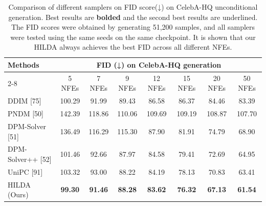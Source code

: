 \begin{table}[t]
    \centering
    \footnotesize
    \setlength{\tabcolsep}{2pt}
    \renewcommand{\arraystretch}{0.9}
    \begin{tabular}{l|ccccccc}
    \toprule
    \multirow{2}{*}{Methods} & \multicolumn{7}{c}{FID (↓) on CelebA-HQ generation} \\
    \cmidrule(lr){2-8}
    & 5 NFEs & 7 NFEs & 9 NFEs & 12 NFEs & 15 NFEs & 20 NFEs & 50 NFEs \\
    \midrule
    DDIM [75] & 100.29 & 91.99 & 89.43 & 86.58 & 86.37 & 84.46 & 83.39 \\
    PNDM [50] & 142.39 & 118.86 & 110.06 & 109.69 & 109.19 & 108.87 & 107.70 \\
    DPM-Solver [51] & 136.49 & 116.29 & 115.30 & 87.90 & 81.91 & 74.79 & 68.90 \\
    DPM-Solver++ [52] & 101.46 & 92.66 & 87.97 & 84.58 & 79.41 & 72.69 & 64.95 \\
    UniPC [91] & 103.32 & 93.00 & 88.22 & 84.19 & 78.13 & 70.83 & 63.41 \\
    \midrule
    HILDA (Ours) & \textbf{99.30} & \textbf{91.46} & \textbf{88.28} & \textbf{83.62} & \textbf{76.32} & \textbf{67.13} & \textbf{61.54} \\
    \bottomrule
    \end{tabular}
    \caption{Comparison of different samplers on FID score(↓) on CelebA-HQ unconditional generation. Best results are \textbf{bolded} and the second best results are underlined. The FID scores were obtained by generating 51,200 samples, and all samplers were tested using the same seeds on the same checkpoint. It is shown that our HILDA always achieves the best FID across all different NFEs.}
    \label{tab_fid_comparison}
\end{table}



